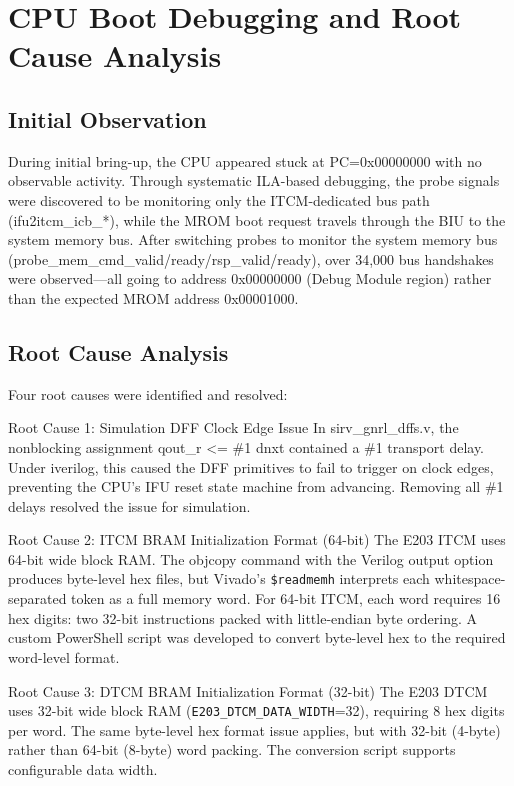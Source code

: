 \section{CPU Boot Debugging and Root Cause Analysis}\label{sec:4_4}

\subsection{Initial Observation}

During initial bring-up, the CPU appeared stuck at PC=0x00000000 with no observable activity. Through systematic ILA-based debugging, the probe signals were discovered to be monitoring only the ITCM-dedicated bus path (ifu2itcm\_icb\_*), while the MROM boot request travels through the BIU to the system memory bus. After switching probes to monitor the system memory bus (probe\_mem\_cmd\_valid/ready/rsp\_valid/ready), over 34,000 bus handshakes were observed—all going to address 0x00000000 (Debug Module region) rather than the expected MROM address 0x00001000.


\subsection{Root Cause Analysis}

Four root causes were identified and resolved:


Root Cause 1: Simulation DFF Clock Edge Issue In sirv\_gnrl\_dffs.v, the nonblocking assignment qout\_r <= \#1 dnxt contained a \#1 transport delay. Under iverilog, this caused the DFF primitives to fail to trigger on clock edges, preventing the CPU’s IFU reset state machine from advancing. Removing all \#1 delays resolved the issue for simulation.


Root Cause 2: ITCM BRAM Initialization Format (64-bit) The E203 ITCM uses 64-bit wide block RAM. The objcopy command with the Verilog output option produces byte-level hex files, but Vivado's \texttt{\$readmemh} interprets each whitespace-separated token as a full memory word. For 64-bit ITCM, each word requires 16 hex digits: two 32-bit instructions packed with little-endian byte ordering. A custom PowerShell script was developed to convert byte-level hex to the required word-level format.


Root Cause 3: DTCM BRAM Initialization Format (32-bit) The E203 DTCM uses 32-bit wide block RAM (\texttt{E203\_DTCM\_DATA\_WIDTH}=32), requiring 8 hex digits per word. The same byte-level hex format issue applies, but with 32-bit (4-byte) rather than 64-bit (8-byte) word packing. The conversion script supports configurable data width.


